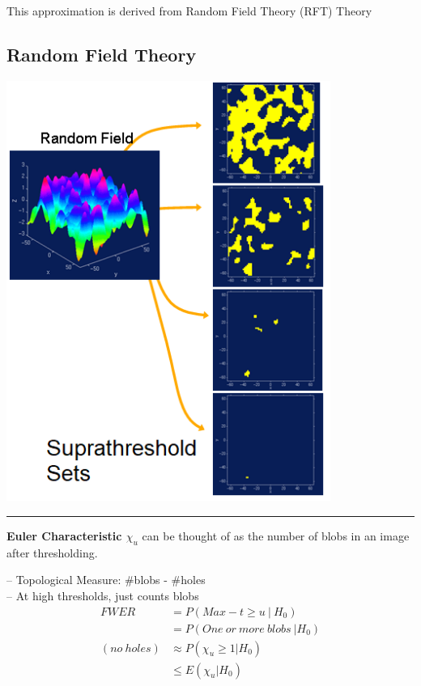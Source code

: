 \documentclass[]{article}
\begin{document}
This approximation is derived from Random Field Theory (RFT) Theory

\subsection{Random Field Theory}\label{random-field-theory}

\begin{center}\includegraphics[width=400px]{./figs/RFT_supraThreshold} \end{center}

\begin{center}\rule{0.5\linewidth}{\linethickness}\end{center}

\textbf{Euler Characteristic \(\chi_u\) } can be thought of as the
number of blobs in an image after thresholding.

-- Topological Measure: \#blobs - \#holes\\
-- At high thresholds, just counts blobs \[
\begin{aligned}
  FWER &= P(Max-t\geq u\ |\ H_0)\\
       &= P(One\ or\ more\ blobs\ |H_0)\\
  (no\ holes) &\approx P(\chi_u\geq 1|H_0)\\
       &\leq E(\chi_u|H_0)
\end{aligned}
\]
\end{document}
